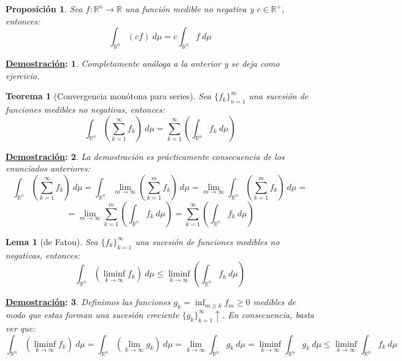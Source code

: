 \documentclass[10pt,a4paper,openright]{book}
\theoremstyle{break}
\newtheorem*{theo}{Teorema}
\newtheorem*{lema}{Lema}
\newtheorem*{prop}{Proposición}
\newtheorem*{demo}{\underline{Demostración}:}
\newcommand{\dif}[1]{\ d#1}
\begin{document}
\begin{prop}
Sea $f: \mathbb{R}^n \rightarrow \mathbb{R}$ una función medible no negativa y $c\in \mathbb{R}^+$, entonces: 
$$\int_{\mathbb{R}^n} \left(c f\right) \dif{\mu} = c \int_{\mathbb{R}^n}f \dif{\mu}$$
\end{prop}
\begin{demo}
Completamente análoga a la anterior y se deja como ejercicio.
\end{demo}

\begin{theo}[Convergencia monótona para series]
Sea $\{f_k\}_{n=1}^{\infty}$ una sucesión de funciones medibles no negativas, entonces: 
$$\int_{\mathbb{R}^n} \left(\sum_{k=1}^{\infty} f_k \right) \dif{\mu} = \sum_{k=1}^{\infty}\left( \int_{\mathbb{R}^n} f_k \dif{\mu}\right)$$
\end{theo}
\begin{demo}
La demostración es prácticamente consecuencia de los enunciados anteriores:
$$\int_{\mathbb{R}^n} \left(\sum_{k=1}^{\infty} f_k\right) \dif{\mu} = \int_{\mathbb{R}^n} \lim_{m \rightarrow \infty} \left(\sum_{k=1}^{m} f_k \right)\dif{\mu} = \lim_{m \rightarrow \infty}\int_{\mathbb{R}^n} \left(\sum_{k=1}^{m} f_k\right) \dif{\mu} = $$
$$=\lim_{m \rightarrow \infty} \sum_{k=1}^{m} \left(\int_{\mathbb{R}^n} f_k \dif{\mu}\right) = \sum_{k=1}^{\infty} \left(\int_{\mathbb{R}^n} f_k \dif{\mu}\right) $$
\end{demo}

\begin{lema}[de Fatou]
Sea $\{f_k\}_{k=1}^{\infty}$ una sucesión de funciones medibles no negativas, entonces: 
$$\int_{\mathbb{R}^n} \left( \liminf_{k \rightarrow \infty}f_k \right) \dif{\mu} \le \liminf_{k \rightarrow \infty} \left(\int_{\mathbb{R}^n} f_k \dif{\mu}\right) $$
\end{lema}
\begin{demo}
Definimos las funciones $g_k = \inf_{m \ge k} f_m \ge 0$ medibles de modo que estas forman una sucesión creciente $\{g_k\}_{k=1}^\infty\uparrow$. En consecuencia, basta ver que:
$$\int_{\mathbb{R}^n} \left(\liminf_{k \rightarrow \infty}f_k \right) \dif{\mu} = \int_{\mathbb{R}^n} \left(\lim_{k \rightarrow \infty}g_k \right)\dif{\mu} =  \lim_{k \rightarrow \infty} \int_{\mathbb{R}^n} g_k \dif{\mu} = \liminf_{k \rightarrow \infty}\int_{\mathbb{R}^n} g_k \dif{\mu} \le \liminf_{k \rightarrow \infty} \int_{\mathbb{R}^n} f_k \dif{\mu}$$
\end{demo}
\end{document}
